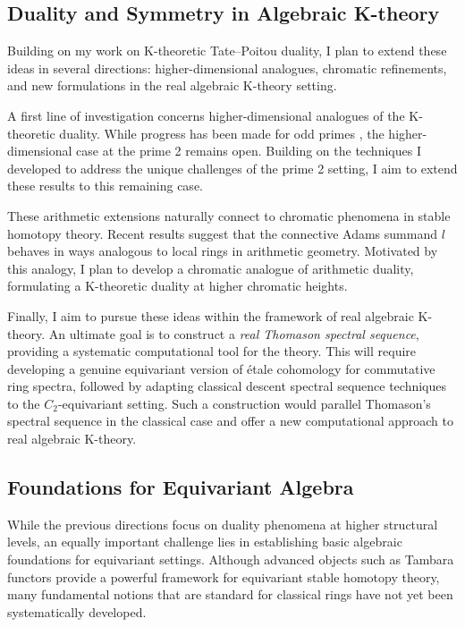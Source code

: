 \documentclass[11pt]{article}
\begin{document}
\subsection*{Duality and Symmetry in Algebraic K-theory}
Building on my work on K-theoretic Tate–Poitou duality, I plan to extend these ideas in several directions: higher-dimensional analogues, chromatic refinements, and new formulations in the real algebraic K-theory setting.

A first line of investigation concerns higher-dimensional analogues of the K-theoretic duality.
While progress has been made for odd primes \cite{Braunling}, the higher-dimensional case at the prime 2 remains open.
Building on the techniques I developed to address the unique challenges of the prime 2 setting, I aim to extend these results to this remaining case.

These arithmetic extensions naturally connect to chromatic phenomena in stable homotopy theory.
Recent results \cite{HRW} suggest that the connective Adams summand $l$ behaves in ways analogous to local rings in arithmetic geometry.
Motivated by this analogy, I plan to develop a chromatic analogue of arithmetic duality, formulating a K-theoretic duality at higher chromatic heights.

Finally, I aim to pursue these ideas within the framework of real algebraic K-theory.
An ultimate goal is to construct a {\it real Thomason spectral sequence}, providing a systematic computational tool for the theory.
This will require developing a genuine equivariant version of \'etale cohomology for commutative ring spectra, followed by adapting classical descent spectral sequence techniques to the $C_2$-equivariant setting.
Such a construction would parallel Thomason’s spectral sequence in the classical case and offer a new computational approach to real algebraic K-theory.


\subsection*{Foundations for Equivariant Algebra}
While the previous directions focus on duality phenomena at higher structural levels, an equally important challenge lies in establishing basic algebraic foundations for equivariant settings.
Although advanced objects such as Tambara functors provide a powerful framework for equivariant stable homotopy theory, many fundamental notions that are standard for classical rings have not yet been systematically developed.
\end{document}
